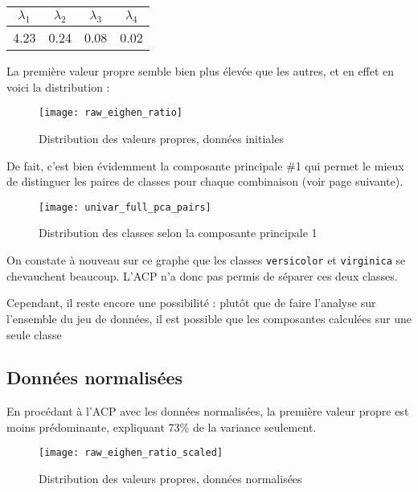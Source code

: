 \documentclass[french]{report}
\begin{document}
    \begin{table}[h]
        \centering
        \begin{tabular}{|c c c c|}
            \hline
            $\lambda_1$ & $\lambda_2$ & $\lambda_3$ & $\lambda_4$ \\
            \hline
            4.23 & 0.24 & 0.08 & 0.02 \\
            \hline
        \end{tabular}
    \end{table}
    
    La première valeur propre semble bien plus élevée que les autres, et en effet en voici la distribution :
    
    \begin{figure}[h]
        \centering
        \texttt{[image: raw\_eighen\_ratio]}
        \caption{Distribution des valeurs propres, données initiales}
    \end{figure}
    \leavevmode
    
    De fait, c'est bien évidemment la composante principale \#1 qui permet le mieux de distinguer les paires de classes pour chaque combinaison (voir page suivante).
    
    \begin{figure}[h]
        \centering
        \texttt{[image: univar\_full\_pca\_pairs]}
        \caption{Distribution des classes selon la composante principale 1}
    \end{figure}
    
    On constate à nouveau sur ce graphe que les classes \texttt{versicolor} et \texttt{virginica} se chevauchent beaucoup.
    L'ACP n'a donc pas permis de séparer ces deux classes.
    
    Cependant, il reste encore une possibilité : plutôt que de faire l'analyse sur l'ensemble du jeu de données, il est possible que les composantes calculées sur une seule classe
    
    \subsection{Données normalisées}
    
    En procédant à l'ACP avec les données normalisées, la première valeur propre est moins prédominante, expliquant 73\% de la variance seulement.
    
    \begin{figure}[h]
        \centering
        \texttt{[image: raw\_eighen\_ratio\_scaled]}
        \caption{Distribution des valeurs propres, données normalisées}
    \end{figure}
    
\end{document}
